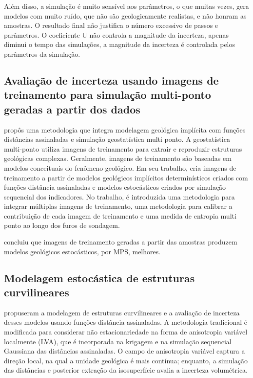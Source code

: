 Além disso, a simulação é muito sensível aos parâmetros, o que muitas vezes, gera modelos com muito ruído, que não são geologicamente realistas, e não honram as amostras. O resultado final não justifica o número excessivo de passos e parâmetros. O coeficiente U não controla a magnitude da incerteza, apenas diminui o tempo das simulações, a magnitude da incerteza é controlada pelos parâmetros da simulação.

\subsection{Avaliação de incerteza usando imagens de treinamento para simulação multi-ponto geradas a partir dos dados}

 propôs uma metodologia que integra modelagem geológica implícita com funções distâncias assinaladas e simulação geostatística multi ponto. A geostatística multi-ponto utiliza imagens de treinamento para extrair e reproduzir estruturas geológicas complexas. Geralmente, imagens de treinamento são baseadas em modelos conceituais do fenômeno geológico. Em seu trabalho,  cria imagens de treinamento a partir de modelos geológicos implícitos determinísticos criados com funções distância assinaladas e modelos estocásticos criados por simulação sequencial dos indicadores. No trabalho, é introduzida uma metodologia  para integrar múltiplas imagens de treinamento, uma metodologia para calibrar a contribuição de cada imagem de treinamento e uma medida de entropia multi ponto ao longo dos furos de sondagem.

 concluiu que imagens de treinamento geradas a partir das amostras produzem modelos geológicos estocásticos, por MPS, melhores.

\subsection{Modelagem estocástica de estruturas curvilineares} 

 propuseram a modelagem de estruturas curvilineares e a avaliação de incerteza desses modelos usando funções distância assinaladas. A metodologia tradicional é modificada para considerar não estacionariedade na forma de anisotropia variável localmente (LVA), que é incorporada na krigagem e na simulação sequencial Gaussiana das distâncias assinaladas. O campo de anisotropia variável captura a direção local, na qual a unidade geológica é mais contínua; enquanto, a simulação das distâncias e posterior extração da isosuperfície avalia a incerteza volumétrica.

